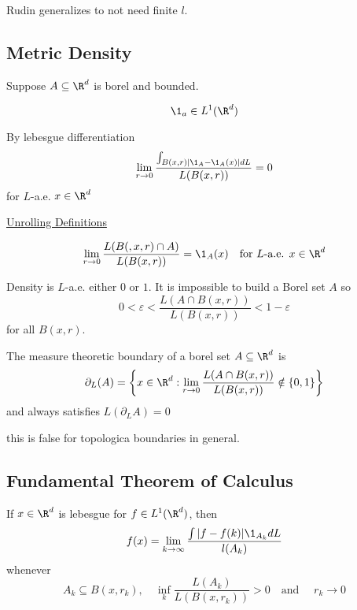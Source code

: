 Rudin generalizes to not need finite $l$.

\subsection{Metric Density}

Suppose $A \subseteq \R^d$ is borel and bounded.

\begin{remark}
	 \[
		\1_a \in L^1 (\R^d)
	\]
\end{remark}

By lebesgue differentiation
\begin{align*}
	\lim_{r \to 0} \frac{\int_{B(x,r) |\1_A - \1_A(x)| dL}}{L(B(x,r))} = 0
\end{align*} for $L$-a.e. $x \in \R^d$

\underline{Unrolling Definitions}

\[
	\lim_{r \to 0}  \frac{L(B(,x,r) \cap A)}{L(B(x,r))} = \1_{A} (x)
	\quad \text{for } L \text{-a.e. } x \in \R^d
\]

Density is $L$-a.e. either $0$ or $1$. It is impossible to build a Borel set $A$ so
\[
	0 < \varepsilon < \frac{L(A \cap B(x,r))}{L(B(x,r))} < 1 - \varepsilon
\]
for all $B(x,r)$.

\begin{remark}
	The measure theoretic boundary of a borel set $A \subseteq \R^d$ is
	\[
\partial_{L}(A) = \left\{x \in \R^d : \lim_{r \to 0}  \frac{L(A \cap B(x,r))}{L(B(x,r))} \notin \{0,1\} \right\}
	\]
	and always satisfies $L(\partial_{L} A) = 0$
\end{remark}


\begin{remark}
	this is false for topologica boundaries in general.
\end{remark}



\subsection{Fundamental Theorem of Calculus}

\begin{lemma}
	If $x \in \R^d$ is lebesgue for $f \in L^1 (\R^d)$, then
	\[
		f(x) = \lim_{k \to \infty}  \frac{\int | f - f(k) |\1_{A_k} dL}{l(A_{k})}
	\] whenever
	\[
		A_k \subseteq B(x,r_{k}), \quad \inf_{k} \frac{L(A_k)}{L(B(x,r_k))} > 0 \quad \text{and }\quad r_k \to 0
	\]
\end{lemma}

